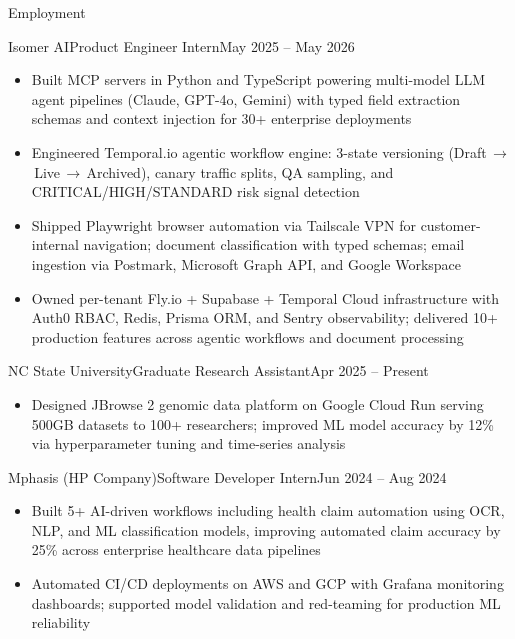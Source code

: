 \documentclass{mcdowellcv}
\begin{document}
\fontsize{10}{12}\selectfont
\makeheader

\begin{cvsection}{Employment}

  \begin{cvsubsection}{Isomer AI}{Product Engineer Intern}{May 2025 -- May 2026}
    \begin{itemize}
      \item Built MCP servers in Python and TypeScript powering multi-model LLM agent pipelines (Claude, GPT-4o, Gemini) with typed field extraction schemas and context injection for 30+ enterprise deployments
      \item Engineered Temporal.io agentic workflow engine: 3-state versioning (Draft\,{\small$\to$}\,Live\,{\small$\to$}\,Archived), canary traffic splits, QA sampling, and CRITICAL/HIGH/STANDARD risk signal detection
      \item Shipped Playwright browser automation via Tailscale VPN for customer-internal navigation; document classification with typed schemas; email ingestion via Postmark, Microsoft Graph API, and Google Workspace
      \item Owned per-tenant Fly.io + Supabase + Temporal Cloud infrastructure with Auth0 RBAC, Redis, Prisma ORM, and Sentry observability; delivered 10+ production features across agentic workflows and document processing
    \end{itemize}
  \end{cvsubsection}

  \begin{cvsubsection}{NC State University}{Graduate Research Assistant}{Apr 2025 -- Present}
    \begin{itemize}
      \item Designed JBrowse 2 genomic data platform on Google Cloud Run serving 500GB datasets to 100+ researchers; improved ML model accuracy by 12\% via hyperparameter tuning and time-series analysis
    \end{itemize}
  \end{cvsubsection}

  \begin{cvsubsection}{Mphasis (HP Company)}{Software Developer Intern}{Jun 2024 -- Aug 2024}
    \begin{itemize}
      \item Built 5+ AI-driven workflows including health claim automation using OCR, NLP, and ML classification models, improving automated claim accuracy by 25\% across enterprise healthcare data pipelines
      \item Automated CI/CD deployments on AWS and GCP with Grafana monitoring dashboards; supported model validation and red-teaming for production ML reliability
    \end{itemize}
  \end{cvsubsection}


\end{cvsection}
\end{document}
